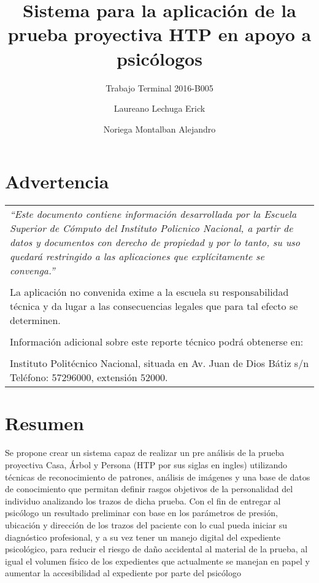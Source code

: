 \documentclass[oneside,12pt]{book}
\title{Sistema para la aplicación de la prueba proyectiva HTP en apoyo a psicólogos}
\subtitle{Trabajo Terminal 2016-B005}
\author{Laureano Lechuga Erick  \and  \color{authorColor} Noriega Montalban Alejandro}
\begin{document}
\maketitle
\thispagestyle{empty}
\tableofcontents
\chapter*{Advertencia}

\begin{center}
\begin{tabular}{ ||m{33em}|| } 
 \hline
 \hline
 \textit{``Este documento contiene información desarrollada por la Escuela Superior de Cómputo del Instituto Policnico Nacional, a partir de datos y documentos con derecho de propiedad y por lo tanto, su uso quedará restringido a las aplicaciones que explícitamente se convenga.''}\\
 \\
 La aplicación no convenida exime a la escuela su responsabilidad técnica y da lugar a las consecuencias legales que para tal efecto se determinen.\\
 \\
 Información adicional sobre este reporte técnico podrá obtenerse en:\\
 \\
 Instituto Politécnico Nacional, situada en Av. Juan de Dios Bátiz s/n Teléfono: 57296000, extensión 52000.\\ 
 \hline
 \hline
\end{tabular}
\end{center}

 
\chapter*{Resumen}

Se propone crear un sistema capaz de realizar un pre análisis de la prueba proyectiva Casa, Árbol y Persona (HTP por sus siglas en ingles) utilizando técnicas de reconocimiento de patrones, análisis de imágenes y una base de datos de conocimiento que permitan definir rasgos objetivos de la personalidad del individuo analizando los trazos de dicha prueba. Con el fin de entregar al psicólogo un resultado preliminar con base en los parámetros de presión, ubicación y dirección de los trazos del paciente con lo cual pueda iniciar su diagnóstico profesional, y a su vez tener un manejo digital del expediente psicológico, para reducir el riesgo de daño accidental al material de la prueba, al igual el volumen físico de los expedientes que actualmente se manejan en papel y aumentar la accesibilidad al expediente por parte del psicólogo
\end{document}
